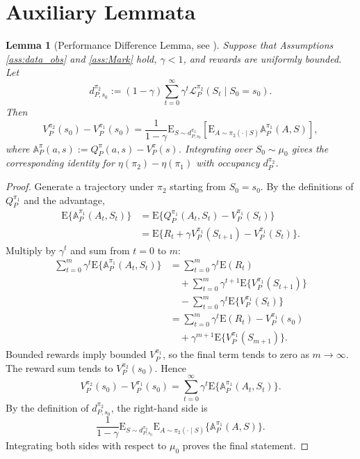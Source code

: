 \documentclass[12pt]{article}
\newtheorem{lemma}[theorem]{Lemma}
\theoremstyle{remark}\newtheorem{remark}[theorem]{Remark}\theoremstyle{plain}
\newcommand{\E}{\mathrm{E}}
\begin{document}
\section{Auxiliary Lemmata}

\begin{lemma}[Performance Difference Lemma, see \cite{kakade2002approximately}]\label{AuLem:PerDiffLem}
    Suppose that Assumptions \ref{ass:data_obs} and \ref{ass:Mark}
    hold, $\gamma<1$, and rewards are uniformly bounded.  Let
    \[
        d_{P,s_0}^{\pi_2}
        :=(1-\gamma)\sum_{t=0}^{\infty}\gamma^t
        \mathcal L_P^{\pi_2}(S_t\mid S_0=s_0).
    \]
    Then
    \[
        V_P^{\pi_2}(s_0)-V_P^{\pi_1}(s_0)
        =
        \frac{1}{1-\gamma}
        \E_{S\sim d_{P,s_0}^{\pi_2}}
        \left[
        \E_{A\sim\pi_2(\cdot\mid S)}
        \mathbb A_P^{\pi_1}(A,S)\right],
    \]
    where
    $\mathbb A_P^\pi(a,s):=Q_P^\pi(a,s)-V_P^\pi(s)$.
    Integrating over $S_0\sim\mu_0$ gives the corresponding identity
    for $\eta(\pi_2)-\eta(\pi_1)$ with occupancy
    $d_P^{\pi_2}$.
\end{lemma}

\begin{proof}
    Generate a trajectory under $\pi_2$ starting from $S_0=s_0$.
    By the definitions of $Q_P^{\pi_1}$ and the advantage,
    \[
        \begin{aligned}
        \E\{\mathbb A_P^{\pi_1}(A_t,S_t)\}
        &=
        \E\{Q_P^{\pi_1}(A_t,S_t)-V_P^{\pi_1}(S_t)\}\\
        &=
        \E\{R_t+\gamma V_P^{\pi_1}(S_{t+1})
        -V_P^{\pi_1}(S_t)\}.
        \end{aligned}
    \]
    Multiply by $\gamma^t$ and sum from $t=0$ to $m$:
    \[
        \begin{aligned}
        \sum_{t=0}^m\gamma^t
        \E\{\mathbb A_P^{\pi_1}(A_t,S_t)\}
        &=
        \sum_{t=0}^m\gamma^t\E(R_t)\\
        &\quad+
        \sum_{t=0}^m\gamma^{t+1}
        \E\{V_P^{\pi_1}(S_{t+1})\}\\
        &\quad-
        \sum_{t=0}^m\gamma^t
        \E\{V_P^{\pi_1}(S_t)\}\\
        &=
        \sum_{t=0}^m\gamma^t\E(R_t)
        -V_P^{\pi_1}(s_0)\\
        &\quad+
        \gamma^{m+1}
        \E\{V_P^{\pi_1}(S_{m+1})\}.
        \end{aligned}
    \]
    Bounded rewards imply bounded $V_P^{\pi_1}$, so the final term
    tends to zero as $m\to\infty$.  The reward sum tends to
    $V_P^{\pi_2}(s_0)$.  Hence
    \[
        V_P^{\pi_2}(s_0)-V_P^{\pi_1}(s_0)
        =
        \sum_{t=0}^{\infty}\gamma^t
        \E\{\mathbb A_P^{\pi_1}(A_t,S_t)\}.
    \]
    By the definition of $d_{P,s_0}^{\pi_2}$, the right-hand side is
    \[
        \frac1{1-\gamma}
        \E_{S\sim d_{P,s_0}^{\pi_2}}
        \E_{A\sim\pi_2(\cdot\mid S)}
        \{\mathbb A_P^{\pi_1}(A,S)\}.
    \]
    Integrating both sides with respect to $\mu_0$ proves the final
    statement.
\end{proof}
\end{document}
